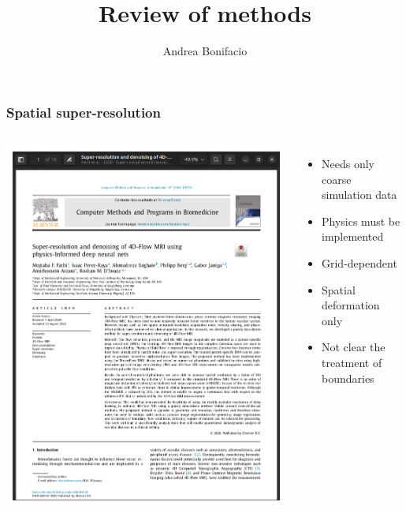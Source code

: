 \documentclass{beamer}
\title{Review of methods}
\author{Andrea Bonifacio}
\begin{document}
\beamertemplatenavigationsymbolsempty
\begin{frame}
\titlepage
\end{frame}

\begin{frame}
\frametitle{Spatial super-resolution}
\begin{columns}

\includegraphics[scale=0.13]{figures/PINN_SuperResolution.png}
\begin{itemize}
    \item Needs only coarse simulation data
    \item Physics must be implemented
    \item Grid-dependent
    \item Spatial deformation only
    \item Not clear the treatment of boundaries
\end{itemize}
\end{columns}
\end{frame}
\end{document}
